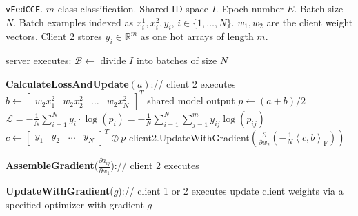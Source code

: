 \documentclass{article}
\begin{document}
  \noindent\begin{minipage}{\textwidth}
    \begin{algorithm}[H]
    \caption{\texttt{vFedCCE}. $m$-class classification. Shared ID space $I$. Epoch number $E$. Batch size $N$. Batch examples indexed as $x_i^1,x_i^2,y_i$, $i\in\{1,\ldots,N\}.$ $w_1,w_2$ are the client weight vectors. Client 2 stores $y_i\in\mathbb{R}^m$ as one hot arrays of length $m$.}
    \label{vflalgo}
    \DontPrintSemicolon
    \SetAlgoNoLine
    server executes:\;
     {
      $\mathcal{B}\leftarrow$ divide $I$ into batches of size $N$\;
    }\;
    
    \textbf{CalculateLossAndUpdate}$(a)$:\quad // client 2 executes\;
    $b\leftarrow\begin{bmatrix} w_2x_1^2& w_2x_2^2& \ldots &w_2x_N^2 \end{bmatrix}^T$\;
    shared model output $p\leftarrow(a+b)/2$\;
    $\mathcal{L}=-\frac{1}{N}\sum_{i=1}^{N}y_i\cdot \log(p_i)=-\frac{1}{N}\sum_{i=1}^N\sum_{j=1}^m y_{ij}\log(p_{ij})$\;
    $c\leftarrow\begin{bmatrix}y_1&y_2&\ldots&y_N\end{bmatrix}^T\oslash p$\;
    client2.UpdateWithGradient$\left(\frac{\partial}{\partial w_2}\left(-\frac{1}{N}\left\langle c,b\right\rangle_\mathrm{F}\right)\right)$\;
    \;\;

    \textbf{AssembleGradient}($\frac{\partial a_{ij}}{\partial w_1}$):\quad // client 2 executes\;
    \;\;

    \textbf{UpdateWithGradient}($g$):\quad // client 1 or 2 executes\;
    update client weights via a specified optimizer with gradient $g$\;
    \end{algorithm}
\end{minipage}
\end{document}
